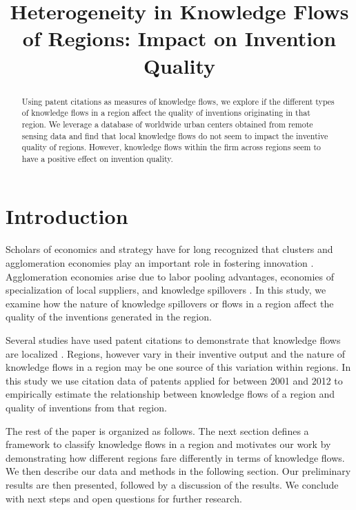 \documentclass[parskip=full,12pt,letterpaper]{article}
\begin{document}
\setlength{\droptitle}{-5em}
\title{\textbf{\large Heterogeneity in Knowledge Flows of Regions: Impact on Invention Quality}}
\date{\vspace{-12ex}}

\maketitle
\thispagestyle{empty}
\renewcommand{\abstractname}{\large Abstract}
\begin{abstract}
\normalsize
\noindent Using patent citations as measures of knowledge flows, we explore if the different types of knowledge flows in a region affect the quality of inventions originating in that region. We leverage a database of worldwide urban centers  obtained from remote sensing data and find that  local knowledge flows  do not seem to impact the inventive quality of regions. However, knowledge flows within the firm across regions seem to have a positive effect on invention quality.
\end{abstract}

\section*{Introduction}
Scholars of economics and strategy have for long recognized that clusters and agglomeration economies play an important role in fostering innovation \citep{Marshall1890, Porter1990}. Agglomeration economies arise due to labor pooling advantages, economies of specialization of local suppliers, and knowledge spillovers \citep{Porter1990, Krugman1991a}. In this study, we examine how the nature of knowledge spillovers or flows in a region affect the quality of the inventions generated in the region.\par
Several studies have used patent citations to demonstrate that knowledge flows are localized \citep*{Jaffe1993, Almeida1999, Alcacer2006a}. Regions, however vary in their inventive output \citep*{Agrawal2014} and the nature of knowledge flows in a region may be one source of this variation within regions. In this study we use citation data of patents applied for between 2001 and 2012 to empirically estimate the relationship between knowledge flows of a region and quality of inventions from that region. \par
The rest of the paper is organized as follows. The next section defines a framework to classify knowledge flows in a region and motivates our work by demonstrating how different regions fare differently in terms of knowledge flows. We then describe our data and methods in the following section. Our preliminary results are then presented, followed by a discussion of the results. We conclude with next steps and open questions for further research.
\end{document}
